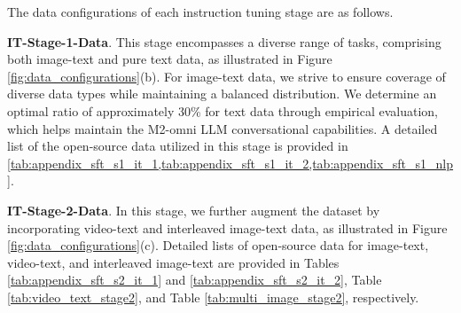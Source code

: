 The data configurations of each instruction tuning stage are as follows.

\textbf{IT-Stage-1-Data}.
This stage encompasses a diverse range of tasks, comprising both image-text and pure text data, as illustrated in Figure \ref{fig:data_configurations}(b).  For image-text data, we strive to ensure coverage of diverse data types while maintaining a balanced distribution. We determine an optimal ratio of approximately 30\% for text data through empirical evaluation, which helps maintain the M2-omni LLM conversational capabilities. A detailed list of the open-source data utilized in this stage is provided in \cref{tab:appendix_sft_s1_it_1,tab:appendix_sft_s1_it_2,tab:appendix_sft_s1_nlp}.



\textbf{IT-Stage-2-Data}.
In this stage, we further augment the dataset by incorporating video-text and interleaved image-text data, as illustrated in Figure \ref{fig:data_configurations}(c). Detailed lists of open-source data for image-text, video-text, and interleaved image-text are provided in Tables \ref{tab:appendix_sft_s2_it_1} and \ref{tab:appendix_sft_s2_it_2}, Table \ref{tab:video_text_stage2}, and Table \ref{tab:multi_image_stage2}, respectively.



